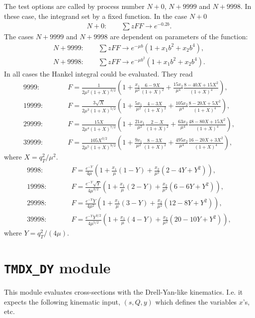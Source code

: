 \documentclass[prd,nofootinbib,eqsecnum,final]{revtex4}
\renewcommand{\(}{\left(}
\renewcommand{\)}{\right)}
\renewcommand{\[}{\left[}
\renewcommand{\]}{\right]}
\begin{document}
The test options are called by process number $N+0$, $N+9999$ and $N+9998$. In these case, the integrand set by a fixed function. In the case $N+0$
\begin{eqnarray}
N+0:\qquad \sum z FF \to e^{-0.2b}.
\end{eqnarray}
The cases $N+9999$ and $N+9998$ are dependent on parameters of the function:
\begin{eqnarray}
N+9999:\qquad \sum z FF \to e^{-\mu b}(1+x_1 b^2+x_2 b^4),
\\
N+9998:\qquad \sum z FF \to e^{-\mu b^2}(1+x_1 b^2+x_2 b^4).
\end{eqnarray}
In all cases the Hankel integral could be evaluated. They read
\begin{eqnarray}
\text{9999}:&\qquad& F=\frac{1}{2\mu^2(1+X)^{3/2}}\(1+\frac{x_1}{\mu^2}\frac{6-9X}{(1+X)^2}+\frac{15x_2}{\mu^4}\frac{8-40X+15 X^2}{(1+X)^4}\),
\\
\text{19999}:&\qquad& F=\frac{3\sqrt{X}}{2\mu^3(1+X)^{5/2}}\(1+\frac{5x_1}{\mu^2}\frac{4-3X}{(1+X)^2}+\frac{105x_2}{\mu^4}\frac{8-20X+5 X^2}{(1+X)^4}\),
\\
\text{29999}:&\qquad& F=\frac{15 X}{2\mu^4(1+X)^{7/2}}\(1+\frac{21x_1}{\mu^2}\frac{2-X}{(1+X)^2}+\frac{63x_2}{\mu^4}\frac{48-80X+15 X^2}{(1+X)^4}\),
\\
\text{39999}:&\qquad& F=\frac{105 X^{3/2}}{2\mu^5(1+X)^{9/2}}\(1+\frac{9x_1}{\mu^2}\frac{8-3X}{(1+X)^2}+\frac{495x_2}{\mu^4}\frac{16-20X+3 X^2}{(1+X)^4}\),
\end{eqnarray}
where $X=q_T^2/\mu^2$.
\begin{eqnarray}
\text{9998}:&\qquad& F=\frac{e^{-Y}}{4\mu}\(1+\frac{x_1}{\mu}(1-Y)+\frac{x_2}{\mu^2}(2-4Y+Y^2)\),
\\
\text{19998}:&\qquad& F=\frac{e^{-Y}\sqrt{Y}}{4\mu^{3/2}}\(1+\frac{x_1}{\mu}(2-Y)+\frac{x_2}{\mu^2}(6-6Y+Y^2)\),
\\
\text{29998}:&\qquad& F=\frac{e^{-Y}Y}{4\mu^2}\(1+\frac{x_1}{\mu}(3-Y)+\frac{x_2}{\mu^2}(12-8Y+Y^2)\),
\\
\text{39998}:&\qquad& F=\frac{e^{-Y}Y^{3/2}}{4\mu^{5/2}}\(1+\frac{x_1}{\mu}(4-Y)+\frac{x_2}{\mu^2}(20-10Y+Y^2)\),
\end{eqnarray}
where $Y=q_T^2/(4\mu)$.

\newpage
\section{\texttt{TMDX{\_}DY} module}
\label{TMDX}

This module evaluates cross-sections with the Drell-Yan-like kinematics. I.e. it expects the following kinematic input, $(s,Q,y)$ which defines the variables $x$'s, etc.
\end{document}
